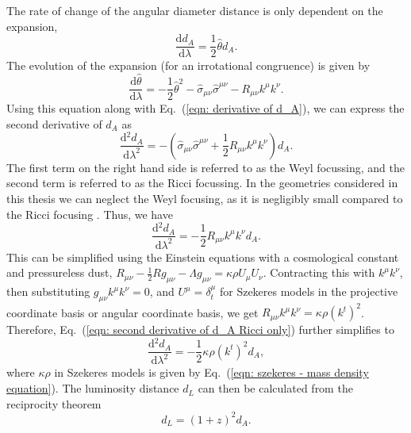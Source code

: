 \documentclass[a4paper,12pt]{report}
\newcommand{\deriv}[2]{\frac{\text{d}{#1}}{\text{d}{#2}}}
\renewcommand{\eqref}[1]{Eq.~({#1})}
\begin{document}
The rate of change of the angular diameter distance is only dependent on the expansion,
\begin{equation}\label{eqn: derivative of d_A}
  \deriv{d_A}{\lambda} = \frac{1}{2}\widehat{\theta}d_A.
\end{equation}
The evolution of the expansion (for an irrotational congruence) is given by
\begin{equation}\label{eqn: Sachs eqns theta}
    \deriv{\widehat{\theta}}{\lambda} = -\frac{1}{2}\widehat{\theta}^2 -\widehat{\sigma}_{\mu\nu}\widehat{\sigma}^{\mu\nu} - R_{\mu\nu}k^\mu k^\nu.
\end{equation}
Using this equation along with \eqref{\ref{eqn: derivative of d_A}}, we can express the second derivative of $d_A$ as
\begin{equation}\label{eqn: d_A second derivative no simplification}
  \deriv{^2 d_A}{\lambda^2} = - \left(\widehat{\sigma}_{\mu\nu}\widehat{\sigma}^{\mu\nu} + \frac{1}{2}R_{\mu\nu}k^\mu k^\nu\right)d_A.
\end{equation}
The first term on the right hand side is referred to as the Weyl focussing, and the second term is referred to as the Ricci focussing. In the geometries considered in this thesis we can neglect the Weyl focusing, as it is negligibly small compared to the Ricci focusing \cite{RN99,RN3}. Thus, we have
\begin{equation} \label{eqn: second derivative of d_A Ricci only}
  \deriv{^2 d_A}{\lambda^2} = - \frac{1}{2}R_{\mu\nu}k^\mu k^\nu d_A.
\end{equation}
This can be simplified using the Einstein equations with a cosmological constant and pressureless dust, $R_{\mu\nu} - \frac{1}{2}Rg_{\mu\nu} - \Lambda g_{\mu\nu} = \kappa\rho U_\mu U_\nu$. Contracting this with $k^\mu k^\nu$, then substituting $g_{\mu\nu}k^\mu k^\nu = 0$, and $U^\mu = \delta^\mu_t$ for Szekeres models in the projective coordinate basis or angular coordinate basis, we get $R_{\mu\nu}k^\mu k^\nu = \kappa \rho (k^t)^2$. Therefore, \eqref{\ref{eqn: second derivative of d_A Ricci only}} further simplifies to
\begin{equation}\label{eqn: final d_A diff equation}
  \deriv{^2 d_A}{\lambda^2} = - \frac{1}{2}\kappa\rho (k^t)^2 d_A,
\end{equation}
where $\kappa \rho$ in Szekeres models is given by \eqref{\ref{eqn: szekeres - mass density equation}}.
The luminosity distance $d_L$ can then be calculated from the reciprocity theorem \cite{RN64,RN102}
\begin{equation}
  d_L = (1+z)^2 d_A.
\end{equation}
\end{document}
